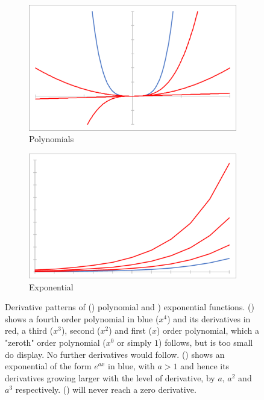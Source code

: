 \documentclass[main.tex]{subfiles}
\begin{document}
    \begin{figure}[h]
      \begin{subfigure}{0.48\linewidth}
        \centering
        \includegraphics[width=0.9\linewidth]{figures/derivPoly}
        \caption{Polynomials}
        \label{fig:deriv:poly}
      \end{subfigure}
      \begin{subfigure}{0.48\linewidth}
        \centering
        \includegraphics[width=0.9\linewidth]{figures/derivExp}
        \caption{Exponential}
        \label{fig:deriv:exp}
      \end{subfigure}
      \caption{Derivative patterns of () polynomial and ) exponential functions. () shows a fourth order polynomial in blue ($x^4$) and its derivatives in red, a third ($x^3$), second ($x^2$) and first ($x$) order polynomial, which a "zeroth" order polynomial ($x^0$ or simply $1$) follows, but is too small do display. No further derivatives would follow. () shows an exponential of the form $e^{a x}$ in blue, with $a>1$ and hence its derivatives growing larger with the level of derivative, by $a$, $a^2$ and $a^3$ respectively. () will never reach a zero derivative.}
      \label{fig:deriv}
    \end{figure}
  
\end{document}
